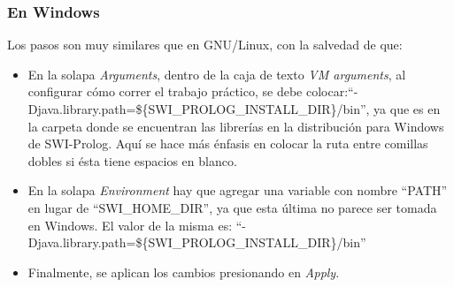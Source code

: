 \subsubsection{En Windows}

Los pasos son muy similares que en GNU/Linux, con la salvedad de que:

\begin{itemize}

\item En la solapa \emph{Arguments}, dentro de la caja de texto \emph{VM
arguments}, al configurar cómo correr el trabajo práctico, se debe
colocar:\newline ``-Djava.library.path=\$\{SWI\_PROLOG\_INSTALL\_DIR\}/bin'',
ya que es en la carpeta  donde se encuentran las librerías en la
distribución para Windows de SWI-Prolog. Aquí se hace más énfasis en colocar la
ruta entre comillas dobles si ésta tiene espacios en blanco.

\item En la solapa \emph{Environment} hay que agregar una variable con nombre
``PATH'' en lugar de ``SWI\_HOME\_DIR'', ya que esta última no parece ser
tomada en Windows. El valor de la misma es:\newline
``-Djava.library.path=\$\{SWI\_PROLOG\_INSTALL\_DIR\}/bin''

\item Finalmente, se aplican los cambios presionando en \emph{Apply}.

\end{itemize}

